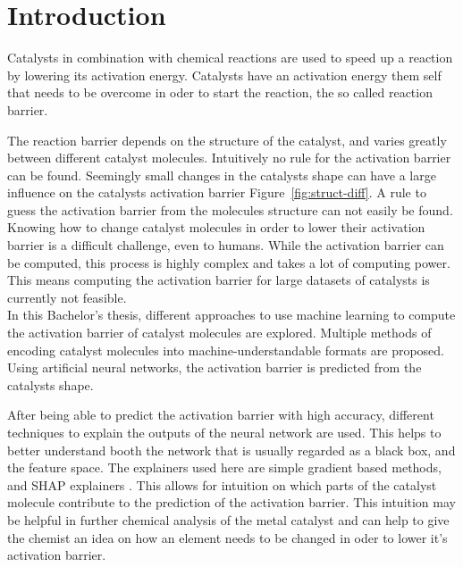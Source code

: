 
\chapter{Introduction}
\label{ch:Introduction}


Catalysts in combination with chemical reactions are used to speed up a reaction by lowering its activation energy. 
Catalysts have an activation energy them self that needs to be overcome in oder to start the reaction, the so called reaction barrier.

The reaction barrier depends on the structure of the catalyst, and varies greatly between different catalyst molecules.
Intuitively no rule for the activation barrier can be found.
Seemingly small changes in the catalysts shape can have a large influence on the catalysts activation barrier Figure~\ref{fig:struct-diff}.
A rule to guess the activation barrier from the molecules structure can not easily be found.  
Knowing how to change catalyst molecules in order to lower their activation barrier is a difficult challenge, even to humans. %
While the activation barrier can be computed, this process is highly complex and takes a lot of computing power.
This means computing the activation barrier for large datasets of catalysts is currently not feasible.
\\
In this Bachelor's thesis, different approaches to use machine learning to compute the activation barrier of catalyst molecules are explored.
Multiple methods of encoding catalyst molecules into machine-understandable formats are proposed.
Using artificial neural networks, the activation barrier is predicted from the catalysts shape.

After being able to predict the activation barrier with high accuracy, different techniques to explain the 
outputs of the neural network are used.
This helps to better understand booth the network that is usually regarded as a black box, and the feature space.
The explainers used here are simple gradient based methods, and SHAP explainers \cite{NIPS2017_7062}.
This allows for intuition on which parts of the catalyst molecule contribute to the prediction of the activation barrier.
This intuition may be helpful in further chemical analysis of the metal catalyst and can help to give the 
chemist an idea on how an element needs to be changed in oder to lower it's activation barrier.
\\

